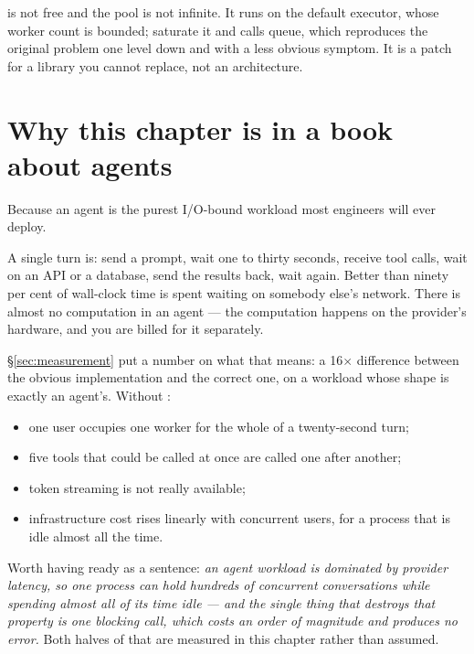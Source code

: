 \begin{warning}
 is not free and the pool is not infinite. It runs on the
default executor, whose worker count is bounded; saturate it and calls queue,
which reproduces the original problem one level down and with a less obvious
symptom. It is a patch for a library you cannot replace, not an architecture.
\end{warning}

\section{Why this chapter is in a book about agents}
\label{sec:why-async-agents}

Because an agent is the purest I/O-bound workload most engineers will ever
deploy.

A single turn is: send a prompt, wait one to thirty seconds, receive tool calls,
wait on an API or a database, send the results back, wait again. Better than
ninety per cent of wall-clock time is spent waiting on somebody else's network.
There is almost no computation in an agent --- the computation happens on the
provider's hardware, and you are billed for it separately.

\S\ref{sec:measurement} put a number on what that means: a 16$\times$ difference
between the obvious implementation and the correct one, on a workload whose shape
is exactly an agent's. Without :

\begin{itemize}[leftmargin=1.4em,nosep]
\item one user occupies one worker for the whole of a twenty-second turn;
\item five tools that could be called at once are called one after another;
\item token streaming is not really available;
\item infrastructure cost rises linearly with concurrent users, for a process
      that is idle almost all the time.
\end{itemize}

\begin{note}
Worth having ready as a sentence: \emph{an agent workload is dominated by
provider latency, so one process can hold hundreds of concurrent conversations
while spending almost all of its time idle --- and the single thing that destroys
that property is one blocking call, which costs an order of magnitude and
produces no error.} Both halves of that are measured in this chapter rather than
assumed.
\end{note}

